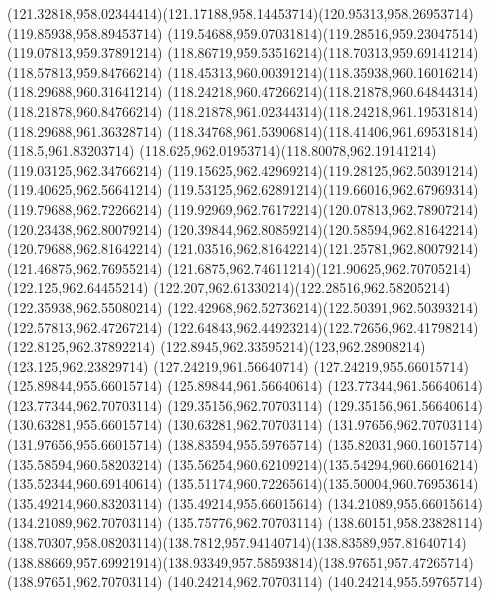 {{	\curveto(121.32818,958.02344414)(121.17188,958.14453714)(120.95313,958.26953714)
	\lineto(119.85938,958.89453714)
	\curveto(119.54688,959.07031814)(119.28516,959.23047514)(119.07813,959.37891214)
	\curveto(118.86719,959.53516214)(118.70313,959.69141214)(118.57813,959.84766214)
	\curveto(118.45313,960.00391214)(118.35938,960.16016214)(118.29688,960.31641214)
	\curveto(118.24218,960.47266214)(118.21878,960.64844314)(118.21878,960.84766214)
	\curveto(118.21878,961.02344314)(118.24218,961.19531814)(118.29688,961.36328714)
	\curveto(118.34768,961.53906814)(118.41406,961.69531814)(118.5,961.83203714)
	\curveto(118.625,962.01953714)(118.80078,962.19141214)(119.03125,962.34766214)
	\curveto(119.15625,962.42969214)(119.28125,962.50391214)(119.40625,962.56641214)
	\curveto(119.53125,962.62891214)(119.66016,962.67969314)(119.79688,962.72266214)
	\curveto(119.92969,962.76172214)(120.07813,962.78907214)(120.23438,962.80079214)
	\curveto(120.39844,962.80859214)(120.58594,962.81642214)(120.79688,962.81642214)
	\curveto(121.03516,962.81642214)(121.25781,962.80079214)(121.46875,962.76955214)
	\curveto(121.6875,962.74611214)(121.90625,962.70705214)(122.125,962.64455214)
	\curveto(122.207,962.61330214)(122.28516,962.58205214)(122.35938,962.55080214)
	\curveto(122.42968,962.52736214)(122.50391,962.50393214)(122.57813,962.47267214)
	\curveto(122.64843,962.44923214)(122.72656,962.41798214)(122.8125,962.37892214)
	\curveto(122.8945,962.33595214)(123,962.28908214)(123.125,962.23829714)
	\closepath
	\moveto(127.24219,961.56640714)
	\lineto(127.24219,955.66015714)
	\lineto(125.89844,955.66015714)
	\lineto(125.89844,961.56640614)
	\lineto(123.77344,961.56640614)
	\lineto(123.77344,962.70703114)
	\lineto(129.35156,962.70703114)
	\lineto(129.35156,961.56640614)
	\closepath
	\moveto(130.63281,955.66015714)
	\lineto(130.63281,962.70703114)
	\lineto(131.97656,962.70703114)
	\lineto(131.97656,955.66015714)
	\closepath
	\moveto(138.83594,955.59765714)
	\lineto(135.82031,960.16015714)
	\lineto(135.58594,960.58203214)
	\curveto(135.56254,960.62109214)(135.54294,960.66016214)(135.52344,960.69140614)
	\curveto(135.51174,960.72265614)(135.50004,960.76953614)(135.49214,960.83203114)
	\lineto(135.49214,955.66015614)
	\lineto(134.21089,955.66015614)
	\lineto(134.21089,962.70703114)
	\lineto(135.75776,962.70703114)
	\lineto(138.60151,958.23828114)
	\curveto(138.70307,958.08203114)(138.7812,957.94140714)(138.83589,957.81640714)
	\curveto(138.88669,957.69921914)(138.93349,957.58593814)(138.97651,957.47265714)
	\lineto(138.97651,962.70703114)
	\lineto(140.24214,962.70703114)
	\lineto(140.24214,955.59765714)
}}
